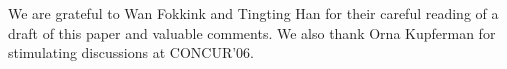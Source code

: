 \documentclass[times, 10 pt,twocolumn]{article}
\begin{document}
\vspace{2mm}

 We are grateful to Wan Fokkink and
Tingting Han for their careful reading of a draft of this paper
and valuable comments. We also thank Orna Kupferman for
stimulating discussions at CONCUR'06.

%
%
%
%
%
%
%
%
\end{document}
